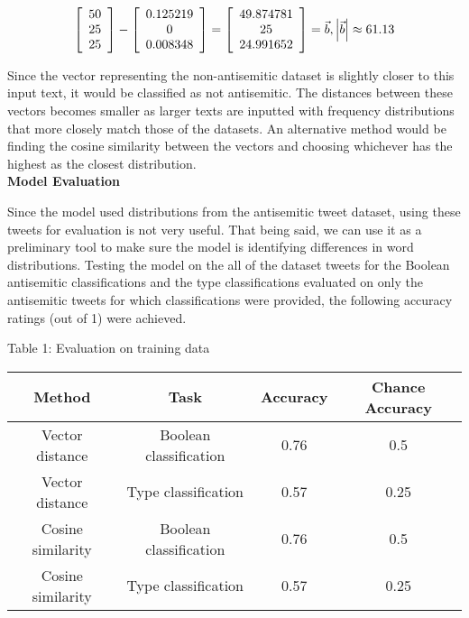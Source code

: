\documentclass{article}
\begin{document}
\[
\left[ {\begin{array}{c}
    50\\
    25\\
    25\\
  \end{array} } \right] - \left[ {\begin{array}{c}
    0.125219\\
    0\\
    0.008348\\
  \end{array} } \right] = \left[ {\begin{array}{c}
    49.874781\\
    25\\
    24.991652\\
  \end{array} } \right] = \vec{b},\hfill \left| \vec{b} \right| \approx 61.13
\]

Since the vector representing the non-antisemitic dataset is slightly closer to this input text, it would be classified as not antisemitic. The distances between these vectors becomes smaller as larger texts are inputted with frequency distributions that more closely match those of the datasets. An alternative method would be finding the cosine similarity between the vectors and choosing whichever has the highest as the closest distribution.\\

{\bf Model Evaluation}

Since the model used distributions from the antisemitic tweet dataset, using these tweets for evaluation is not very useful. That being said, we can use it as a preliminary tool to make sure the model is identifying differences in word distributions. Testing the model on the all of the dataset tweets for the Boolean antisemitic classifications and the type classifications evaluated on only the antisemitic tweets for which classifications were provided, the following accuracy ratings (out of 1) were achieved.
\begin{center}
Table 1: Evaluation on training data\\
\begin{tabular}{ |c|c|c|c| } 
 \hline
{\bf Method} & \bf{Task} & \bf{Accuracy} & \bf{Chance Accuracy}\\
\hline Vector distance & Boolean classification & 0.76 & 0.5\\ 
\hline Vector distance & Type classification & 0.57 & 0.25\\ 
\hline Cosine similarity & Boolean classification & 0.76 & 0.5\\ 
\hline Cosine similarity & Type classification & 0.57 & 0.25\\ 
 \hline
\end{tabular}
\end{center}
\end{document}
